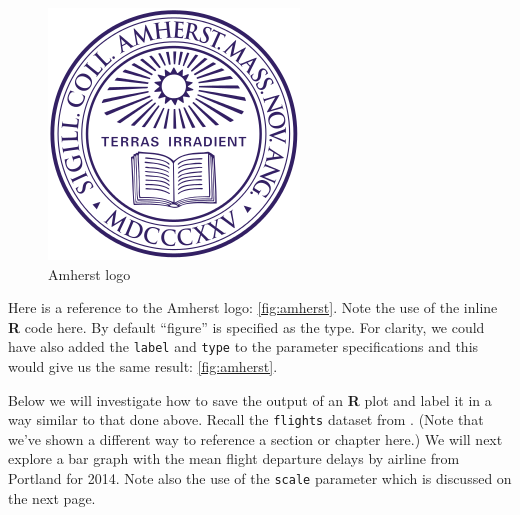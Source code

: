 \documentclass[12pt,twoside]{amherstthesis}
\begin{document}
  \begin{figure}[htbp]
  \centering
  \includegraphics[scale = 1,angle = 0]{figure/amherst.png}
  \caption[Amherst logo]{\normalsize{Amherst logo}}
  \label{fig:amherst}
  \end{figure}
  
  Here is a reference to the Amherst logo: \autoref{fig:amherst}. Note the
  use of the inline \textbf{R} code here. By default ``figure'' is
  specified as the type. For clarity, we could have also added the
  \texttt{label} and \texttt{type} to the parameter specifications and
  this would give us the same result: \autoref{fig:amherst}.
  
  \clearpage 
  
  Below we will investigate how to save the output of an \textbf{R} plot
  and label it in a way similar to that done above. Recall the
  \texttt{flights} dataset from \protect\hyperlink{rmd-basics}{}. (Note
  that we've shown a different way to reference a section or chapter
  here.) We will next explore a bar graph with the mean flight departure
  delays by airline from Portland for 2014. Note also the use of the
  \texttt{scale} parameter which is discussed on the next page.
  
  \begin{Shaded}
  \end{Shaded}
  
\end{document}
